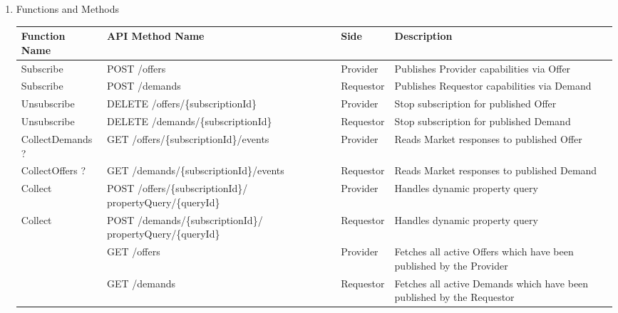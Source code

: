 \begin{enumerate}
\begin{enumerate}
\item Functions and Methods

\begin{center}
\begin{tabular}{|p{3cm}|p{7cm}|p{1.5cm}|p{4cm}|} 
\hline
\rowcolor{lightgray}	Function Name	& API Method Name	& 	Side	&	Description \\
\hline

Subscribe			&	POST /offers							&	Provider	&	Publishes Provider capabilities via Offer \\
\hline

Subscribe			&	POST /demands							& 	Requestor	&	Publishes Requestor capabilities via Demand \\
\hline

Unsubscribe			&	DELETE	/offers/\{subscriptionId\}		&	Provider	&	Stop subscription for published Offer \\
\hline

Unsubscribe			&	DELETE	/demands/\{subscriptionId\}		&	Requestor	&	Stop subscription for published Demand \\
\hline	 

CollectDemands ?	&	GET	/offers/\{subscriptionId\}/events	&	Provider &	Reads Market responses to published Offer \\
\hline

CollectOffers ?		&	GET	/demands/\{subscriptionId\}/events	&	Requestor &	Reads Market responses to published Demand \\
\hline

Collect				& 	POST /offers/\{subscriptionId\}/ \newline propertyQuery/\{queryId\} & Provider & Handles dynamic property query \\
\hline

Collect				& 	POST /demands/\{subscriptionId\}/ \newline propertyQuery/\{queryId\} & Requestor & Handles dynamic property query \\
\hline 

					&	GET /offers								&	Provider	&	Fetches all active Offers which have been published by the Provider \\
\hline

					&	GET /demands							& 	Requestor	&	Fetches all active Demands which have been published by the Requestor \\
\hline	 

\end{tabular}
\end{center}


\end{enumerate}
\end{enumerate}
